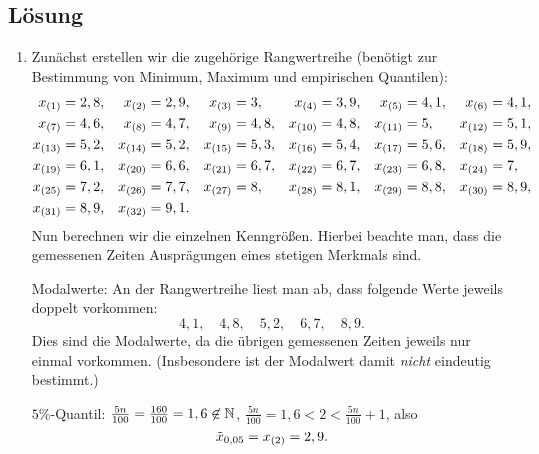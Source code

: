\documentclass{exercise}
\begin{document}
    \subsection*{Lösung}
    \begin{enumerate}
        \item Zunächst erstellen wir die zugehörige Rangwertreihe (benötigt zur Bestimmung von Minimum, Maximum und empirischen Quantilen):
        \begin{align*}
            x_{\parentheses*{1}} &= 2,8, & x_{\parentheses*{2}} &= 2,9, & x_{\parentheses*{3}} &= 3, & x_{\parentheses*{4}} &= 3,9, & x_{\parentheses*{5}} &= 4,1, & x_{\parentheses*{6}} &= 4,1,\\
            x_{\parentheses*{7}} &= 4,6, & x_{\parentheses*{8}} &= 4,7, & x_{\parentheses*{9}} &= 4,8, & x_{\parentheses*{10}} &= 4,8, & x_{\parentheses*{11}} &= 5, & x_{\parentheses*{12}} &= 5,1,\\
            x_{\parentheses*{13}} &= 5,2, & x_{\parentheses*{14}} &= 5,2, & x_{\parentheses*{15}} &= 5,3, & x_{\parentheses*{16}} &= 5,4, & x_{\parentheses*{17}} &= 5,6, & x_{\parentheses*{18}} &= 5,9,\\
            x_{\parentheses*{19}} &= 6,1, & x_{\parentheses*{20}} &= 6,6, & x_{\parentheses*{21}} &= 6,7, & x_{\parentheses*{22}} &= 6,7, & x_{\parentheses*{23}} &= 6,8, & x_{\parentheses*{24}} &= 7,\\
            x_{\parentheses*{25}} &= 7,2, & x_{\parentheses*{26}} &= 7,7, & x_{\parentheses*{27}} &= 8, & x_{\parentheses*{28}} &= 8,1, & x_{\parentheses*{29}} &= 8,8, & x_{\parentheses*{30}} &= 8,9,\\
            x_{\parentheses*{31}} &= 8,9, & x_{\parentheses*{32}} &= 9,1.
        \end{align*}
        Nun berechnen wir die einzelnen Kenngrößen.
        Hierbei beachte man, dass die gemessenen Zeiten Ausprägungen eines stetigen Merkmals sind.

        Modalwerte: An der Rangwertreihe liest man ab, dass folgende Werte jeweils doppelt vorkommen:
        \[
            4,1, \quad 4,8, \quad 5,2, \quad 6,7, \quad 8,9.
        \]
        Dies sind die Modalwerte, da die übrigen gemessenen Zeiten jeweils nur einmal vorkommen.
        (Insbesondere ist der Modalwert damit \emph{nicht} eindeutig bestimmt.)

        \(5\%\)-Quantil:
        \(\frac{5n}{100} = \frac{160}{100} = 1,6 \not\in \N\), \(\frac{5n}{100} = 1,6 < 2 < \frac{5n}{100} + 1\), also
        \[
            \tilde{x}_{0,05} = x_{\parentheses*{2}} = 2,9.
        \]


\end{enumerate}
\end{document}
